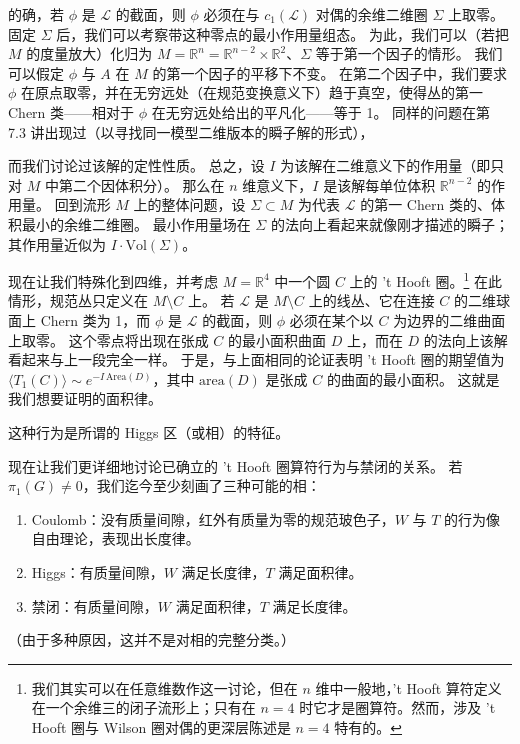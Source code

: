 
的确，若 $\phi$ 是 $\mathcal{L}$ 的截面，则 $\phi$ 必须在与 $c_1(\mathcal{L})$ 对偶的余维二维圈 $\Sigma$ 上取零。
固定 $\Sigma$ 后，我们可以考察带这种零点的最小作用量组态。
为此，我们可以（若把 $M$ 的度量放大）化归为 $M=\mathbb{R}^n=\mathbb{R}^{n-2}\times\mathbb{R}^2$、$\Sigma$ 等于第一个因子的情形。
我们可以假定 $\phi$ 与 $A$ 在 $M$ 的第一个因子的平移下不变。
在第二个因子中，我们要求 $\phi$ 在原点取零，并在无穷远处（在规范变换意义下）趋于真空，使得丛的第一 Chern 类——相对于 $\phi$ 在无穷远处给出的平凡化——等于 1。
同样的问题在第 7.3 讲出现过（以寻找同一模型二维版本的瞬子解的形式），

而我们讨论过该解的定性性质。
总之，设 $I$ 为该解在二维意义下的作用量（即只对 $M$ 中第二个因体积分）。
那么在 $n$ 维意义下，$I$ 是该解每单位体积 $\mathbb{R}^{n-2}$ 的作用量。
回到流形 $M$ 上的整体问题，设 $\Sigma\subset M$ 为代表 $\mathcal{L}$ 的第一 Chern 类的、体积最小的余维二维圈。
最小作用量场在 $\Sigma$ 的法向上看起来就像刚才描述的瞬子；其作用量近似为 $I\cdot\mathrm{Vol}(\Sigma)$。

现在让我们特殊化到四维，并考虑 $M=\mathbb{R}^4$ 中一个圆 $C$ 上的 't Hooft 圈。\footnote{我们其实可以在任意维数作这一讨论，但在 $n$ 维中一般地，'t Hooft 算符定义在一个余维三的闭子流形上；只有在 $n=4$ 时它才是圈算符。然而，涉及 't Hooft 圈与 Wilson 圈对偶的更深层陈述是 $n=4$ 特有的。}
在此情形，规范丛只定义在 $M\setminus C$ 上。
若 $\mathcal{L}$ 是 $M\setminus C$ 上的线丛、它在连接 $C$ 的二维球面上 Chern 类为 1，而 $\phi$ 是 $\mathcal{L}$ 的截面，则 $\phi$ 必须在某个以 $C$ 为边界的二维曲面上取零。
这个零点将出现在张成 $C$ 的最小面积曲面 $D$ 上，而在 $D$ 的法向上该解看起来与上一段完全一样。
于是，与上面相同的论证表明 't Hooft 圈的期望值为 $\langle T_1(C)\rangle\sim e^{-I\,\mathrm{Area}(D)}$，其中 $\mathrm{area}(D)$ 是张成 $C$ 的曲面的最小面积。
这就是我们想要证明的面积律。

这种行为是所谓的 Higgs 区（或相）的特征。

现在让我们更详细地讨论已确立的 't Hooft 圈算符行为与禁闭的关系。
若 $\pi_1(G)\neq0$，我们迄今至少刻画了三种可能的相：
\begin{enumerate}
\item Coulomb：没有质量间隙，红外有质量为零的规范玻色子，$W$ 与 $T$ 的行为像自由理论，表现出长度律。
\item Higgs：有质量间隙，$W$ 满足长度律，$T$ 满足面积律。
\item 禁闭：有质量间隙，$W$ 满足面积律，$T$ 满足长度律。
\end{enumerate}
（由于多种原因，这并不是对相的完整分类。）


